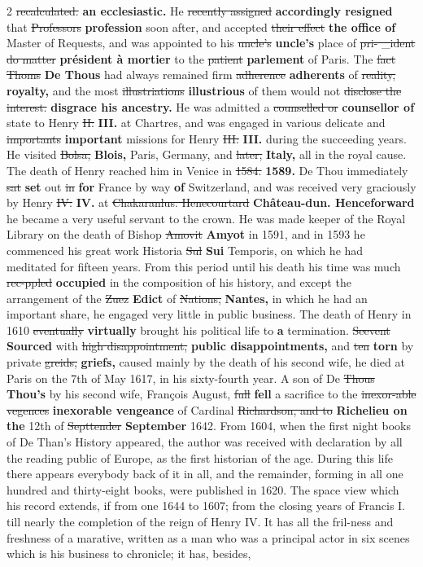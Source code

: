 \documentclass[10pt]{article}
\begin{document}
\begin{multicols}{2}
\sout{recalculated.} \textbf{an ecclesiastic.} He \sout{recently assigned} \textbf{accordingly resigned} that \sout{Professors} \textbf{profession} soon after, and accepted \sout{their effect} \textbf{the office of} Master of Requests, and was appointed to his \sout{uncle’s} \textbf{uncle's} place of \sout{pri- \_ident do matter} \textbf{président à mortier} to the \sout{patient} \textbf{parlement} of Paris. The \sout{fact Thoms} \textbf{De Thous} had always remained firm \sout{adherence} \textbf{adherents} of \sout{reality,} \textbf{royalty,} and the most \sout{illustriations} \textbf{illustrious} of them would not \sout{disclose the interest.} \textbf{disgrace his ancestry.} He was admitted a \sout{counselled or} \textbf{counsellor of} state to Henry \sout{II:} \textbf{III.} at Chartres, and was engaged in various delicate and \sout{importants} \textbf{important} missions for Henry \sout{III:} \textbf{III.} during the succeeding years. He visited \sout{Bolsa,} \textbf{Blois,} Paris, Germany, and \sout{later,} \textbf{Italy,} all in the royal cause. The death of Henry reached him in Venice in \sout{1584.} \textbf{1589.} De Thou immediately \sout{sat} \textbf{set} out \sout{in} \textbf{for} France by way \textbf{of} Switzerland, and was received very graciously by Henry \sout{IV:} \textbf{IV.} at \sout{Chakaranlus. Henecourtard} \textbf{Château-dun. Henceforward} he became a very useful servant to the crown. He was made keeper of the Royal Library on the death of Bishop \sout{Amovit} \textbf{Amyot} in 1591, and in 1593 he commenced his great work Historia \sout{Sul} \textbf{Sui} Temporis, on which he had meditated for fifteen years. From this period until his death his time was much \sout{rec-ppled} \textbf{occupied} in the composition of his history, and except the arrangement of the \sout{Zuez} \textbf{Edict} of \sout{Nations,} \textbf{Nantes,} in which he had an important share, he engaged very little in public business. The death of Henry in 1610 \sout{eventually} \textbf{virtually} brought his political life to \textbf{a} termination. \sout{Seevent} \textbf{Sourced} with \sout{high disappointment,} \textbf{public disappointments,} and \sout{ten} \textbf{torn} by private \sout{greids,} \textbf{griefs,} caused mainly by the death of his second wife, he died at Paris on the 7th of May 1617, in his sixty-fourth year. A son of De \sout{Thous} \textbf{Thou's} by his second wife, François August, \sout{full} \textbf{fell} a sacrifice to the \sout{inexor-able vegences} \textbf{inexorable vengeance} of Cardinal \sout{Richardson, and to} \textbf{Richelieu on the} 12th of \sout{Septtender} \textbf{September} 1642. From 1604, when the first night books of De Than’s History appeared, the author was received with declaration by all the reading public of Europe, as the first historian of the age. During this life there appears everybody back of it in all, and the remainder, forming in all one hundred and thirty-eight books, were published in 1620. The space view which his record extends, if from one 1644 to 1607; from the closing years of Francis I. till nearly the completion of the reign of Henry IV. It has all the fril-ness and freshness of a marative, written as a man who was a principal actor in six scenes which is his business to chronicle; it has, besides, 
\end{multicols}
\end{document}
